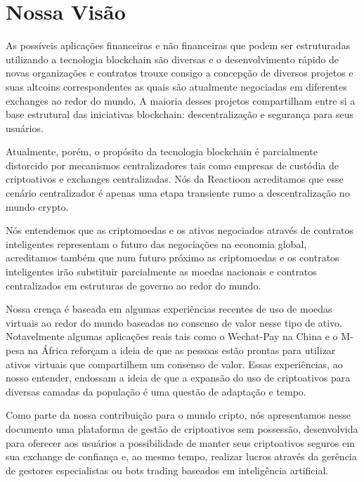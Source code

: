 \documentclass[
	article,			%
	12pt,				%
	oneside,			%
	a4paper,			%
	brazil,				%
	english,
	sumario=tradicional
	]{abntex2}
\begin{document}

\section{Nossa Visão}
As possíveis aplicações financeiras e não financeiras que podem ser estruturadas utilizando a tecnologia blockchain são diversas e o desenvolvimento rápido de novas organizações e contratos trouxe consigo a concepção de diversos projetos e suas altcoins correspondentes as quais são atualmente negociadas em diferentes exchanges ao redor do mundo. A maioria desses projetos compartilham entre si a base estrutural das iniciativas blockchain: descentralização e segurança para seus usuários.

Atualmente, porém, o propósito da tecnologia blockchain é parcialmente distorcido por mecanismos centralizadores tais como empresas de custódia de criptoativos e exchanges centralizadas. Nós da Reactioon acreditamos que esse cenário centralizador é apenas uma etapa transiente rumo a descentralização no mundo crypto.


Nós entendemos que as criptomoedas e os ativos negociados através de contratos inteligentes representam o futuro das negociações na economia global, acreditamos também que num futuro próximo as criptomoedas e os contratos inteligentes irão substituir parcialmente as moedas nacionais e contratos centralizados em estruturas de governo ao redor do mundo. 

Nossa crença é baseada em algumas experiências recentes de uso de moedas virtuais ao redor do mundo baseadas no consenso de valor nesse tipo de ativo. Notavelmente algumas aplicações reais tais como o Wechat-Pay na China e o M-pesa na África reforçam a ideia de que as pessoas estão prontas para utilizar ativos virtuais que compartilhem um consenso de valor. Essas experiências, ao nosso entender, endossam a ideia de que a expansão do uso de criptoativos para diversas camadas da população é uma questão de adaptação e tempo.

Como parte da nossa contribuição para o mundo cripto, nós apresentamos nesse documento uma plataforma de gestão de criptoativos sem possessão, desenvolvida para oferecer aos usuários a possibilidade de manter seus criptoativos seguros em sua exchange de confiança e, ao mesmo tempo, realizar lucros através da gerência de gestores especialistas ou bots trading baseados em inteligência artificial.
\end{document}
